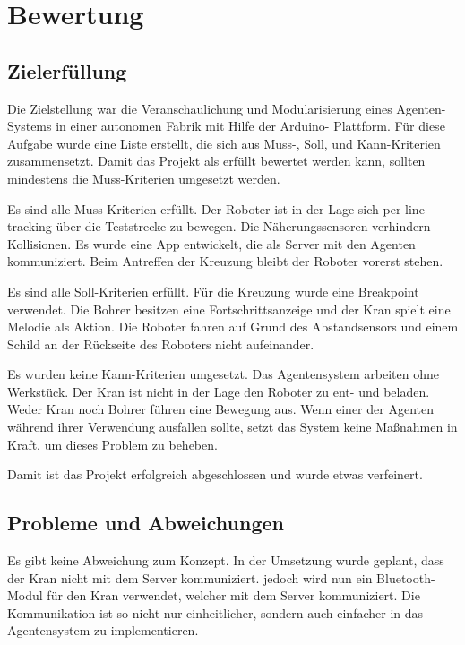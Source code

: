 \chapter{Bewertung}


\section{Zielerfüllung}

Die Zielstellung war die Veranschaulichung und Modularisierung eines Agenten-Systems in einer autonomen Fabrik mit Hilfe der Arduino- Plattform. Für diese Aufgabe wurde eine Liste erstellt, die sich aus Muss-, Soll, und Kann-Kriterien zusammensetzt. Damit das Projekt als erfüllt bewertet werden kann, sollten mindestens die Muss-Kriterien umgesetzt werden.

Es sind alle Muss-Kriterien erfüllt. Der Roboter ist in der Lage sich per line tracking über die Teststrecke zu bewegen. Die Näherungssensoren verhindern Kollisionen. Es wurde eine App entwickelt, die als Server mit den Agenten kommuniziert. Beim Antreffen der Kreuzung bleibt der Roboter vorerst stehen.

Es sind alle Soll-Kriterien erfüllt. Für die Kreuzung wurde eine Breakpoint verwendet. Die Bohrer besitzen eine Fortschrittsanzeige und der Kran spielt eine Melodie als Aktion. Die Roboter fahren auf Grund des Abstandsensors und einem Schild an der Rückseite des Roboters nicht aufeinander.   

Es wurden keine Kann-Kriterien umgesetzt. Das Agentensystem arbeiten ohne Werkstück. Der Kran ist nicht in der Lage den Roboter zu ent- und beladen. Weder Kran noch Bohrer führen eine Bewegung aus. Wenn einer der Agenten während ihrer Verwendung ausfallen sollte, setzt das System keine Maßnahmen in Kraft, um dieses Problem zu beheben. 

Damit ist das Projekt erfolgreich abgeschlossen und wurde etwas verfeinert.

\section{Probleme und Abweichungen}

Es gibt keine Abweichung zum Konzept. In der Umsetzung wurde geplant, dass der Kran nicht mit dem Server kommuniziert. jedoch wird nun ein Bluetooth-Modul für den Kran verwendet, welcher mit dem Server kommuniziert. Die Kommunikation ist so nicht nur einheitlicher, sondern auch einfacher in das Agentensystem zu implementieren.

